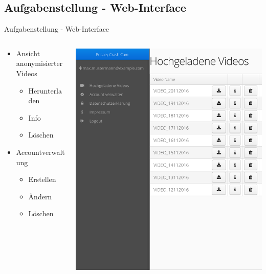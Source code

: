 \documentclass[19pt]{beamer}
\begin{document}
\subsection{Aufgabenstellung - Web-Interface}
\begin{frame}{Aufgabenstellung - Web-Interface}
  \begin{columns}[T]
    \begin{column}{.5\textwidth}
    		\begin{itemize}
    			\item Ansicht anonymisierter Videos
    			\begin{itemize}
					\item Herunterladen
					\item Info
					\item L\"oschen
				\end{itemize}
    			\item Accountverwaltung
    			\begin{itemize}
					\item Erstellen
					\item \"Andern
					\item L\"oschen
				\end{itemize}
    		\end{itemize}
    \end{column}
    \begin{column}{.5\textwidth}
    		\includegraphics[scale=0.5]{logos/Mockups/Webinterface_small_pres}
    \end{column}
  \end{columns}
\end{frame}
\end{document}
